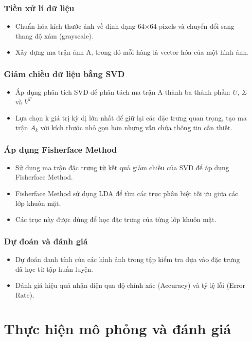 \documentclass[a4paper,12pt]{extarticle}
\begin{document}
\subsubsection{Tiền xử lí dữ liệu}
\begin{itemize}
    \item Chuẩn hóa kích thước ảnh về định dạng 64×64 pixels và chuyển đổi sang thang độ xám (grayscale).
    \item  Xây dựng ma trận ảnh A, trong đó mỗi hàng là vector hóa của một hình ảnh.
\end{itemize}
\subsubsection{Giảm chiều dữ liệu bằng SVD}
\begin{itemize}
    \item Áp dụng phân tích SVD để phân tách ma trận A thành ba thành phần: $U$, $\Sigma$ và $V^T$
    \item Lựa chọn k giá trị kỳ dị lớn nhất để giữ lại các đặc trưng quan trọng, tạo ma trận $A_k$ với kích thước nhỏ gọn hơn nhưng vẫn chứa thông tin cần thiết.
\end{itemize}
\subsubsection{Áp dụng Fisherface Method}
\begin{itemize}
    \item Sử dụng ma trận đặc trưng từ kết quả giảm chiều của SVD để áp dụng Fisherface Method.
    \item Fisherface Method sử dụng LDA để tìm các trục phân biệt tối ưu giữa các lớp khuôn mặt.
    \item Các trục này được dùng để học đặc trưng của từng lớp khuôn mặt.
\end{itemize}
\subsubsection{Dự đoán và đánh giá}
\begin{itemize}
    \item Dự đoán danh tính của các hình ảnh trong tập kiểm tra dựa vào đặc trưng đã học từ tập huấn luyện.
    \item Đánh giá hiệu quả nhận diện qua độ chính xác (Accuracy) và tỷ lệ lỗi (Error Rate).
\end{itemize}

\section{Thực hiện mô phỏng và đánh giá}
\end{document}
